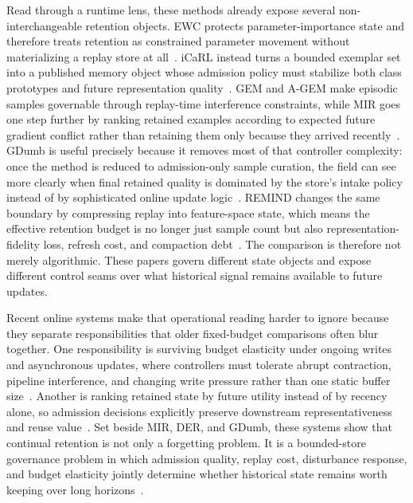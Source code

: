 \documentclass[acmsmall,screen,review]{acmart}
\begin{document}
Read through a runtime lens, these methods already expose several non-interchangeable retention objects. EWC protects parameter-importance state and therefore treats retention as constrained parameter movement without materializing a replay store at all~\cite{kirkpatrick2017ewc}. iCaRL instead turns a bounded exemplar set into a published memory object whose admission policy must stabilize both class prototypes and future representation quality~\cite{rebuffi2017icarl}. GEM and A-GEM make episodic samples governable through replay-time interference constraints, while MIR goes one step further by ranking retained examples according to expected future gradient conflict rather than retaining them only because they arrived recently~\cite{lopez2017gem,chaudhry2019agem,aljundi2019mir}. GDumb is useful precisely because it removes most of that controller complexity: once the method is reduced to admission-only sample curation, the field can see more clearly when final retained quality is dominated by the store's intake policy instead of by sophisticated online update logic~\cite{prabhu2020gdumb}. REMIND changes the same boundary by compressing replay into feature-space state, which means the effective retention budget is no longer just sample count but also representation-fidelity loss, refresh cost, and compaction debt~\cite{hayes2020remind}. The comparison is therefore not merely algorithmic. These papers govern different state objects and expose different control seams over what historical signal remains available to future updates.

Recent online systems make that operational reading harder to ignore because they separate responsibilities that older fixed-budget comparisons often blur together. One responsibility is surviving budget elasticity under ongoing writes and asynchronous updates, where controllers must tolerate abrupt contraction, pipeline interference, and changing write pressure rather than one static buffer size~\cite{zhou2025ferret}. Another is ranking retained state by future utility instead of by recency alone, so admission decisions explicitly preserve downstream representativeness and reuse value~\cite{li2026streamfp}. Set beside MIR, DER, and GDumb, these systems show that continual retention is not only a forgetting problem. It is a bounded-store governance problem in which admission quality, replay cost, disturbance response, and budget elasticity jointly determine whether historical state remains worth keeping over long horizons~\cite{aljundi2019mir,buzzega2020der,prabhu2020gdumb,zhou2025ferret,li2026streamfp}.
\end{document}
